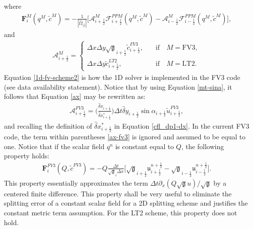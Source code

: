 \documentclass[preprint,12pt]{elsarticle}
\begin{document}
\begin{linenumbers}
\begin{equation}
\end{equation}
where
\begin{align}
	\label{F-operator}
	\mathbf{F}_{i}^M(q^M,\tilde{c}^{M}) =
	- \frac{1}{|\hat{\Omega}_{ij}|}
	\bigg[\mathcal{A}_{i+\frac{1}{2}}^M
	\mathcal{F}_{i+\frac{1}{2}}^{PPM}
	({{q}^M, \tilde{c}^{M}})-
	\mathcal{A}_{i-\frac{1}{2}}^M
	\mathcal{F}_{i-\frac{1}{2}}^{PPM}
	({{q}^M, \tilde{c}^{M}})\bigg],
\end{align}
and
\begin{align}
	\label{ax}
	\mathcal{A}_{i+\frac{1}{2}}^M = 
	\begin{cases}
		{\Delta x}{\Delta y}\sqrt{\mathfrak{g}}_{i+\frac{1}{2}} {\tilde{c}}_{i+\frac{1}{2}}^{FV3},
		\quad &\text{if} \quad M=\text{FV3},\\
		{\Delta x}{\Delta y}{\tilde{c}}_{i+\frac{1}{2}}^{LT2},
		\quad &\text{if} \quad M=\text{LT2}.
	\end{cases}
\end{align}
Equation \eqref{1d-fv-scheme2} is how the 1D solver is implemented in the FV3 code (see data availability statement). 
Notice that by using Equation \eqref{mt-sina}, it follows that Equation \eqref{ax} may be rewritten as:
\begin{align}
	\label{ax-fv3}
	\mathcal{A}_{i+\frac{1}{2}}^{FV3} = 
\bigg( \frac{\hat{\delta} x_{i+\frac{1}{2}}}{\hat{\delta} x_{i+\frac{1}{2}}^*}\bigg)
  		\Delta t
		\hat{\delta} y_{i+\frac{1}{2}} 
		\sin{\alpha_{i+\frac{1}{2}}}
        {\tilde{u}}_{i+\frac{1}{2}}^{FV3},
\end{align}
and recalling the definition of ${\hat{\delta} x_{i+\frac{1}{2}}^*}$ in Equation \eqref{cfl_dp1-dx}.
In the current FV3 code, the term within parentheses \eqref{ax-fv3} is ignored and assumed to be equal to one.
Notice that if the scalar field $q^n$ is constant equal to $Q$, the following property holds:
\begin{align}
	\label{F-operator-prop}
	\mathbf{F}_{i}^{FV3}(Q,\tilde{c}^{FV3}) =
	- Q\frac{\Delta t}{	\sqrt{\mathfrak{g}}_{i}\Delta x}
	\bigg[
	\sqrt{\mathfrak{g}}_{i+\frac{1}{2}}
	\mathfrak{u}_{i+\frac{1}{2}}^{n+\frac{1}{2}}-
	\sqrt{\mathfrak{g}}_{i-\frac{1}{2}}
	\mathfrak{u}_{i-\frac{1}{2}}^{n+\frac{1}{2}}\bigg].
\end{align}
This property essentially approximates the term $\Delta t\partial_x(Q{\sqrt{\mathfrak{g}}u})/\sqrt{\mathfrak{g}}$ by a centered finite difference. 
This property shall be very useful to eliminate the splitting error of a constant scalar field for a 2D splitting scheme and justifies the constant metric term assumption. 
For the LT2 scheme, this property does not hold.


\end{linenumbers}
\end{document}
